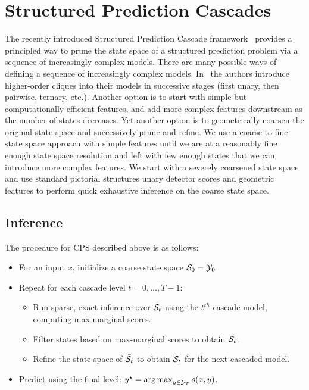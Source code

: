 \section{Structured Prediction Cascades} \label{sec:SPC}
The recently introduced Structured Prediction Cascade framework~\cite{cascades} 
provides a principled way to prune the state space of a structured prediction 
problem via a sequence of increasingly complex models.
There are many possible ways of defining a sequence of increasingly complex 
models.  In~\cite{cascades} the authors introduce higher-order cliques into 
their models in successive stages (first unary, then pairwise, ternary, etc.).  
Another option is to start with simple but computationally efficient features, 
and add more complex features downstream as the number of states decreases.  
Yet another option is to geometrically coarsen the original state space and 
successively prune and refine.
 We use a coarse-to-fine state space approach with simple features until we are 
at a reasonably fine enough state space resolution and left with few enough 
states that we can introduce more complex features.  We start with a severely 
coarsened state space and use standard pictorial structures unary detector 
scores and geometric features to perform quick exhaustive inference on the 
coarse state space.  

\subsection{Inference}
The procedure for CPS described above is as follows:

\begin{itemize}
\item For an input $x$, initialize a coarse state space $\mathcal{S}_0 = \mathcal{Y}_0$

\item Repeat for each cascade level $t = 0,\ldots,T-1$:
\begin{itemize}
\item Run sparse, exact inference over  $\mathcal{S}_t$ using the $t^{th}$ cascade 
model, computing max-marginal scores.
\item Filter states based on max-marginal scores to obtain $\tilde{\mathcal{S}}_t$.  
\item Refine the state space of $\tilde{\mathcal{S}}_t$ to obtain $\mathcal{S}_t$ for the next 
cascaded model.
\end{itemize}
\item Predict using the final level: $y^\star = \mathop{\arg\max}_{y \in \mathcal{Y}_T} s(x,y)$.
\end{itemize}


